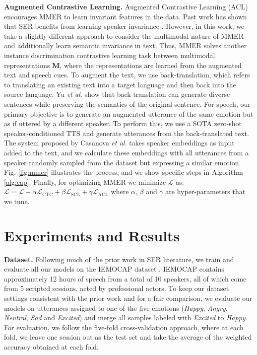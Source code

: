 \documentclass{INTERSPEECH2023}
\begin{document}
{\noindent \textbf{Augmented Contrastive Learning.}} Augmented Contrastive Learning (ACL) encourages MMER to learn invariant features in the data. Past work has shown that SER benefits from learning speaker invariance \cite{9054580}. However, in this work, we take a slightly different approach to consider the multimodal nature of MMER and additionally learn semantic invariance in text. Thus, MMER solves another instance discrimination contrastive learning task between multimodal representations $\mathbf{M}$, where the representations are learned from the augmented text and speech cues. To augment the text, we use back-translation, which refers to translating an existing text into a target language and then back into the source language. Yu \textit{et al.} \cite{yu2018qanet} show that back-translation can generate diverse sentences while preserving the semantics of the original sentence. For speech, our primary objective is to generate an augmented utterance of the same emotion but as if uttered by a different speaker. To perform this, we use a SOTA zero-shot speaker-conditioned TTS \cite{casanova2022yourtts} and generate utterances from the back-translated text. The system proposed by Casanova \textit{et al.} \cite{casanova2022yourtts} takes speaker embeddings as input added to the text, and we calculate these embeddings with all utterances from a speaker randomly sampled from the dataset but expressing a similar emotion. Fig. \ref{fig:mmer} illustrates the process, and we show specific steps in Algorithm \ref{alg:cap}. Finally, for optimizing MMER we minimize $\mathcal{L}$ as: $ \mathcal{L} = \mathcal{L} + \alpha \mathcal{L}_\mathrm{CTC} + \beta \mathcal{L}_\mathrm{SCL} + \gamma \mathcal{L}_\mathrm{ACL}$ where $\alpha$, $\beta$ and $\gamma$ are hyper-parameters that we tune.




\section{Experiments and Results}
\label{sec:experiments}
{\noindent \textbf{Dataset.}} Following much of the prior work in SER literature, we train and evaluate all our models on the IEMOCAP dataset \cite{busso2008iemocap}. IEMOCAP contains approximately 12 hours of speech from a total of 10 speakers, all of which come from 5 scripted sessions, acted by professional actors. To keep our dataset settings consistent with the prior work and for a fair comparison, we evaluate our models on utterances assigned to one of the five emotions (\emph{Happy}, \emph{Angry}, \emph{Neutral}, \emph{Sad} and \emph{Excited}) and merge all samples labeled with \emph{Excited} to \emph{Happy}. For evaluation, we follow the five-fold cross-validation approach, where at each fold, we leave one session out as the test set and take the average of the weighted accuracy obtained at each fold.
\vspace{1mm}
\end{document}
